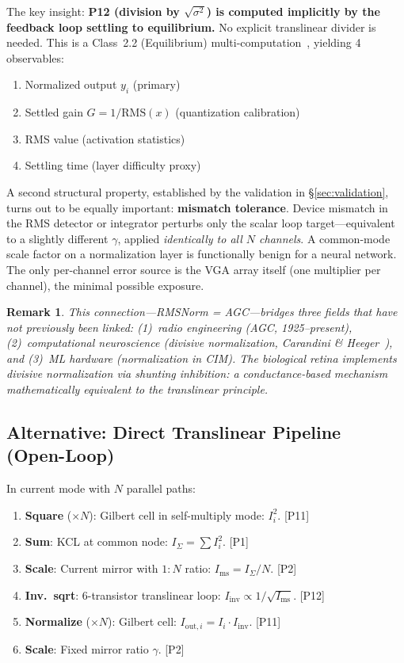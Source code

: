 \documentclass[11pt]{article}
\newtheorem{remark}{Remark}
\begin{document}
The key insight: \textbf{P12 (division by $\sqrt{\sigma^2}$) is computed implicitly by the feedback loop settling to equilibrium.} No explicit translinear divider is needed. This is a Class~2.2 (Equilibrium) multi-computation~\cite{bieg2026}, yielding 4 observables:
\begin{enumerate}
\item Normalized output $y_i$ (primary)
\item Settled gain $G = 1/\text{RMS}(x)$ (quantization calibration)
\item RMS value (activation statistics)
\item Settling time (layer difficulty proxy)
\end{enumerate}

A second structural property, established by the validation in \S\ref{sec:validation}, turns out to be equally important: \textbf{mismatch tolerance}. Device mismatch in the RMS detector or integrator perturbs only the scalar loop target---equivalent to a slightly different $\gamma$, applied \textit{identically to all $N$ channels}. A common-mode scale factor on a normalization layer is functionally benign for a neural network. The only per-channel error source is the VGA array itself (one multiplier per channel), the minimal possible exposure.

\begin{remark}
This connection---RMSNorm = AGC---bridges three fields that have not previously been linked: (1)~radio engineering (AGC, 1925--present), (2)~computational neuroscience (divisive normalization, Carandini \& Heeger~\cite{carandini2012}), and (3)~ML hardware (normalization in CIM). The biological retina implements divisive normalization via shunting inhibition: a conductance-based mechanism mathematically equivalent to the translinear principle.
\end{remark}

\subsection{Alternative: Direct Translinear Pipeline (Open-Loop)}
\label{sec:translinear}

In current mode with $N$ parallel paths:

\begin{enumerate}[leftmargin=*]
\item \textbf{Square} ($\times N$): Gilbert cell in self-multiply mode: $I_i^2$. \hfill [P11]
\item \textbf{Sum}: KCL at common node: $I_{\Sigma} = \sum I_i^2$. \hfill [P1]
\item \textbf{Scale}: Current mirror with $1{:}N$ ratio: $I_{\text{ms}} = I_{\Sigma}/N$. \hfill [P2]
\item \textbf{Inv.\ sqrt}: 6-transistor translinear loop: $I_{\text{inv}} \propto 1/\sqrt{I_{\text{ms}}}$. \hfill [P12]
\item \textbf{Normalize} ($\times N$): Gilbert cell: $I_{\text{out},i} = I_i \cdot I_{\text{inv}}$. \hfill [P11]
\item \textbf{Scale}: Fixed mirror ratio $\gamma$. \hfill [P2]
\end{enumerate}
\end{document}
